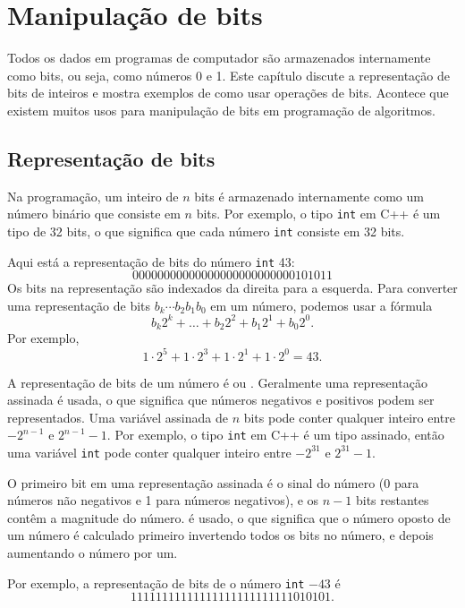 \chapter{Manipulação de bits}

Todos os dados em programas de computador são armazenados internamente como bits,
ou seja, como números 0 e 1.
Este capítulo discute a representação de bits
de inteiros e mostra exemplos
de como usar operações de bits.
Acontece que existem muitos usos para
manipulação de bits em programação de algoritmos.

\section{Representação de bits}


Na programação, um inteiro de $n$ bits é armazenado internamente
como um número binário que consiste em $n$ bits.
Por exemplo, o tipo \texttt{int} em C++ é
um tipo de 32 bits, o que significa que cada número \texttt{int}
consiste em 32 bits.

Aqui está a representação de bits do
número \texttt{int} 43:
\[00000000000000000000000000101011\]
Os bits na representação são indexados da direita para a esquerda.
Para converter uma representação de bits $b_k \cdots b_2 b_1 b_0$ em um número,
podemos usar a fórmula
\[b_k 2^k + \ldots + b_2 2^2 + b_1 2^1 + b_0 2^0.\]
Por exemplo,
\[1 \cdot 2^5 + 1 \cdot 2^3 + 1 \cdot 2^1 + 1 \cdot 2^0 = 43.\]

A representação de bits de um número é
 ou .
Geralmente uma representação assinada é usada,
o que significa que números negativos e positivos
podem ser representados.
Uma variável assinada de $n$ bits pode conter qualquer
inteiro entre $-2^{n-1}$ e $2^{n-1}-1$.
Por exemplo, o tipo \texttt{int} em C++ é
um tipo assinado, então uma variável \texttt{int} pode conter qualquer
inteiro entre $-2^{31}$ e $2^{31}-1$.

O primeiro bit em uma representação assinada
é o sinal do número (0 para números não negativos
e 1 para números negativos), e
os $n-1$ bits restantes contêm a magnitude do número.
 é usado, o que significa que o
número oposto de um número é calculado primeiro
invertendo todos os bits no número,
e depois aumentando o número por um.

Por exemplo, a representação de bits de
o número \texttt{int} $-43$ é
\[11111111111111111111111111010101.\]

